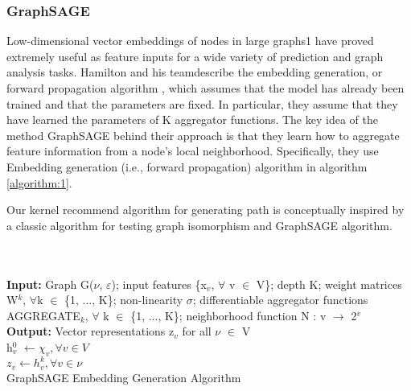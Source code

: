 \subsubsection{GraphSAGE}
Low-dimensional vector embeddings of nodes in large graphs1 have proved extremely useful as feature inputs for a wide variety of prediction and graph analysis tasks. Hamilton and his team\cite{hamilton2017inductive}describe the embedding generation, or forward propagation algorithm , which assumes that the model has already been trained and that the parameters are fixed. In particular, they assume that they have learned the parameters of K aggregator functions. The key idea of the method GraphSAGE behind their approach is that they learn how to aggregate feature information from a node's local neighborhood. Specifically, they use Embedding generation (i.e., forward propagation) algorithm in algorithm \ref{algorithm:1}.
\par Our kernel recommend algorithm for generating path is conceptually inspired by a classic algorithm for testing graph isomorphism and GraphSAGE algorithm.
\\
\\
\\
\begin{algorithm}[H]
\SetAlgoLined
\textbf{Input:} Graph G($\nu$, $\varepsilon $); input features \{x$_{v}$, $ \forall $ v $ \in $ V\}; depth K; weight matrices W$ ^{k} $, $ \forall $k $ \in $ \{1, ..., K\}; non-linearity $ \sigma $; differentiable aggregator functions AGGREGATE$_{k}$, $ \forall $ k $ \in $ \{1, ..., K\}; neighborhood function N : v  $ \rightarrow $ 2$ ^{v} $  \\
\textbf{Output:} Vector representations z$_{v}$ for all $\nu$ $ \in $ V \\
h$_{v}^{0}$ $ \leftarrow \chi _{v},\forall v\in V $ \\
 $ z_{v} \leftarrow h_{v}^{k}, \forall v \in \nu $ \\
 \caption{GraphSAGE Embedding Generation Algorithm}
 \label{algorithm:1}
\end{algorithm}

\cleardoublepage
